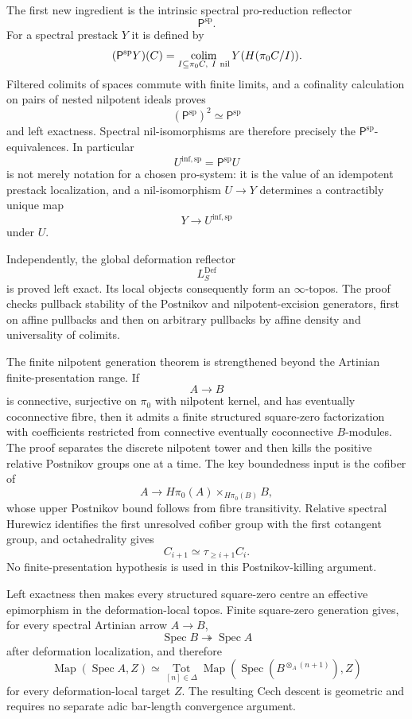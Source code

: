 The first new ingredient is the intrinsic spectral pro-reduction reflector
\[
    \mathsf P^{\mathrm{sp}}.
\]
For a spectral prestack $Y$ it is defined by
\[
    (\mathsf P^{\mathrm{sp}}Y)(C)
    =
    \operatorname*{colim}_{I\subseteq\pi_0C,\ I\ {\rm nil}}
    Y(H(\pi_0C/I)).
\]
Filtered colimits of spaces commute with finite limits, and a cofinality
calculation on pairs of nested nilpotent ideals proves
\[
\boxed{
    (\mathsf P^{\mathrm{sp}})^2
    \simeq
    \mathsf P^{\mathrm{sp}}}
\]
and left exactness.  Spectral nil-isomorphisms are therefore precisely the
$\mathsf P^{\mathrm{sp}}$-equivalences.  In particular
\[
    U^{\mathrm{inf,sp}}
    =
    \mathsf P^{\mathrm{sp}}U
\]
is not merely notation for a chosen pro-system: it is the value of an
idempotent prestack localization, and a nil-isomorphism $U\to Y$ determines a
contractibly unique map
\[
    Y\longrightarrow U^{\mathrm{inf,sp}}
\]
under $U$.

Independently, the global deformation reflector
\[
    L_S^{\mathrm{Def}}
\]
is proved left exact.  Its local objects consequently form an
$\infty$-topos.  The proof checks pullback stability of the Postnikov and
nilpotent-excision generators, first on affine pullbacks and then on arbitrary
pullbacks by affine density and universality of colimits.

The finite nilpotent generation theorem is strengthened beyond the Artinian
finite-presentation range.  If
\[
    A\longrightarrow B
\]
is connective, surjective on $\pi_0$ with nilpotent kernel, and has eventually
coconnective fibre, then it admits a finite structured square-zero
factorization with coefficients restricted from connective eventually
coconnective $B$-modules.  The
proof separates the discrete nilpotent tower and then kills the positive
relative Postnikov groups one at a time.  The key boundedness input is the
cofiber of
\[
    A\longrightarrow
    H\pi_0(A)\times_{H\pi_0(B)}B,
\]
whose upper Postnikov bound follows from fibre transitivity.  Relative spectral
Hurewicz identifies the first unresolved cofiber group with the first
cotangent group, and octahedrality gives
\[
    C_{i+1}
    \simeq
    \tau_{\geq i+1}C_i.
\]
No finite-presentation hypothesis is used in this Postnikov-killing argument.

Left exactness then makes every structured square-zero centre an effective
epimorphism in the deformation-local topos.  Finite square-zero generation
gives, for every spectral Artinian arrow $A\to B$,
\[
    \operatorname{Spec}B
    \twoheadrightarrow
    \operatorname{Spec}A
\]
after deformation localization, and therefore
\[
\boxed{
    \operatorname{Map}(\operatorname{Spec}A,Z)
    \simeq
    \operatorname*{Tot}_{[n]\in\Delta}
    \operatorname{Map}
    \left(
      \operatorname{Spec}(B^{\otimes_A(n+1)}),
      Z
    \right)}
\]
for every deformation-local target $Z$.  The resulting Cech descent is
geometric and requires no separate adic bar-length convergence argument.

